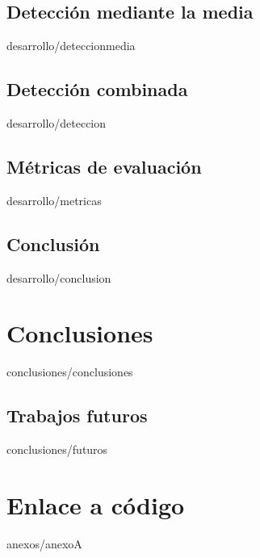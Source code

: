 \documentclass[epsbased,copyright,final,printable,covers,extendedindex,firstnumbered,tfg,gnuplot]{tfgtfmthesisuam}
\begin{document}
  \section{Detecci\'on mediante la media\label{SEC:DETECCIONMEDIA}}{desarrollo/deteccionmedia}
  \section{Detecci\'on combinada\label{SEC:DETECCION}}{desarrollo/deteccion}
  \section{M\'etricas de evaluaci\'on\label{SEC:METRICAS}}{desarrollo/metricas}
  \section{Conclusi\'on\label{SEC:DPCONCLUSION}}{desarrollo/conclusion}
\chapter{Conclusiones\label{CAP:CONCLUSIONES}}{conclusiones/conclusiones}
  \section{Trabajos futuros\label{SEC:FUTUROS}}{conclusiones/futuros}

\appendix

\chapter{Enlace a c\'odigo\label{CAP:ANEXOA}}{anexos/anexoA}
\end{document}
